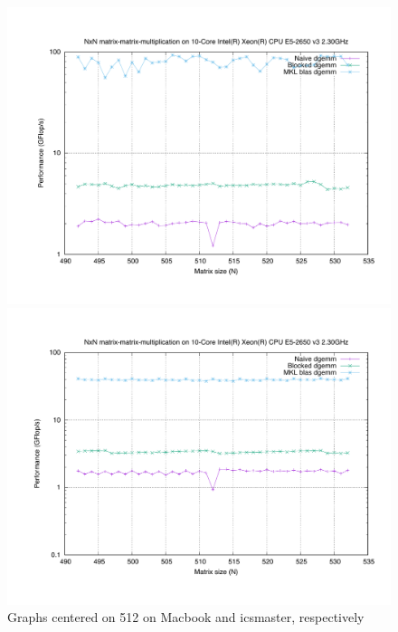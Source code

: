 \documentclass[unicode,11pt,a4paper,oneside,numbers=endperiod,openany]{scrartcl}
\begin{document}
\begin{enumerate}
            \begin{figure}[H]
                \begin{minipage}{.5\textwidth}
                    \centering
                    \includegraphics[width=\linewidth]{./results/512_mac}
                \end{minipage}%
                \hfill
                \begin{minipage}{.5\textwidth}
                    \centering
                    \includegraphics[width=\linewidth]{./results/512_icsmaster}
                \end{minipage}
                \caption{Graphs centered on 512 on Macbook and icsmaster, respectively}
                \label{c512}
            \end{figure}


\end{enumerate}
\end{document}
